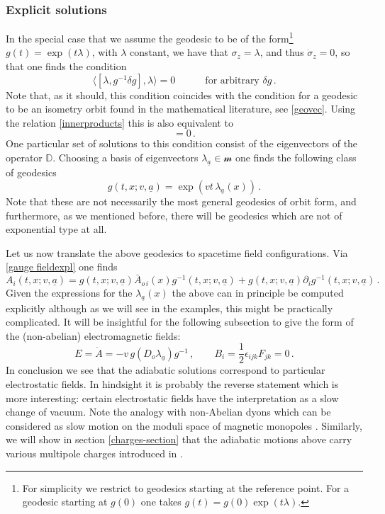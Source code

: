 \documentclass[11pt,a4paper]{article}
\def\calsm{{\boldsymbol{\mathscr m}}}
\def\ua{{\underline{a}}}
\def\pd{\partial}
\def\Dperp{{\mathbb{D}}}
\begin{document}
    \subsubsection{Explicit solutions}
    In the special case that we assume the geodesic to be of the form\footnote{For simplicity we restrict to geodesics starting at the reference point. For a geodesic starting at $g(0)$ one takes $g(t)=g(0)\exp(t\lambda)$.} $g(t)=\exp(t\lambda)$, with $\lambda$ constant, we have that $\sigma_z=\lambda$, and thus $\dot{\sigma}_z=0$, so that one finds the condition
    \begin{equation}
    \langle[\lambda,g^{-1}\delta g], \lambda\rangle=0\qquad\quad\mbox{for arbitrary\ }\delta g\,.\label{endphys}
    \end{equation}
    Note that, as it should, this condition coincides with the condition for a geodesic to be an isometry orbit found in the mathematical literature, see \eqref{geovec}. Using the relation \eqref{innerproducts} this is also equivalent to
    \begin{equation}
   [\lambda,\Dperp\lambda]=0\,.
    \end{equation}
    One particular set of solutions to this condition consist of the eigenvectors of the operator $\Dperp$. Choosing a basis of eigenvectors $\lambda_{\ua}\in\calsm$ one finds the following class of geodesics
    \begin{equation}
    g(t,x;v,\ua)=\exp\left(vt\,\lambda_\ua(x)\right)\label{geosol}\,.
    \end{equation}
        Note that these are not necessarily the most general geodesics of orbit form, and furthermore, as we mentioned before, there will be geodesics which are not of exponential type at all.
    
    Let us now translate the above geodesics to spacetime field configurations. Via \eqref{gauge fieldexpl} one finds
    \begin{equation}
    A_{i}(t,x;v,\ua)=g(t,x;v,\ua)\bar A_{o\,i}(x)g^{-1}(t,x;v,\ua)+g(t,x;v,\ua)\pd_ig^{-1}(t,x;v,\ua)\label{adiabaticsol}\,.
    \end{equation}
    Given the expressions for the $\lambda_\ua(x)$ the above can in principle be computed explicitly although as we will see in the examples, this might be practically complicated. It will be insightful for the following subsection to give the form of the (non-abelian) electromagnetic fields:
    \begin{equation}\label{Esol}
\boxed{    E=\dot A=-v\,g (D_o\lambda_{\ua})g^{-1}\,,\qquad B_i=\frac{1}{2}\epsilon_{ijk}F_{jk}=0\,.}
    \end{equation}
    In conclusion we see that the adiabatic solutions correspond to particular  electrostatic fields. In hindsight it is probably the reverse statement which is more interesting: certain electrostatic fields have the interpretation as a slow change of vacuum. Note the analogy with non-Abelian dyons which can be considered as slow motion on the moduli space of magnetic monopoles \cite{Julia:1975ff}. Similarly, we will show in section \ref{charges-section} that the adiabatic motions above carry various multipole charges introduced in \cite{Seraj:2016jxi}.
    
\end{document}
